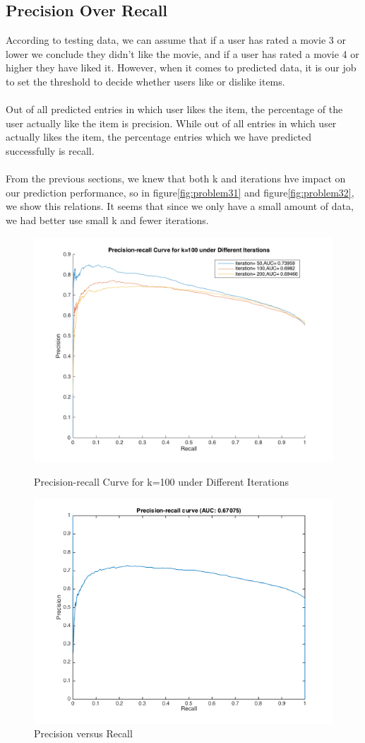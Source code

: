 \documentclass{article}
\begin{document}
\subsection{Precision Over Recall}
According to testing data, we can assume that if a user has rated a movie 3 or lower we conclude they didn't like the movie, and if a user has rated a movie 4 or higher they have liked it. However, when it comes to predicted data, it is our job to set the threshold to decide whether users like or dislike items.\\
\\
Out of all predicted entries in which user likes the item, the percentage of the user actually like the item is precision. While out of all entries in which user actually likes the item, the percentage entries which we have predicted successfully is recall.\\
\\
From the previous sections, we knew that both k and iterations hve impact on our prediction performance, so in figure\ref{fig:problem31} and figure\ref{fig:problem32}, we show this relations. It seems that since we only have a small amount of data, we had better use small k and fewer iterations.
\begin{figure}[htbp]
\centering
\includegraphics[width=.6\textwidth]{problem31.png}
\caption{Precision-recall Curve for k=100 under Different Iterations}
\label{fig:problem31}
\includegraphics[width=.6\textwidth]{problem3.png}
\caption{Precision versus Recall}
\label{fig:problem3}
\end{figure}
\end{document}
